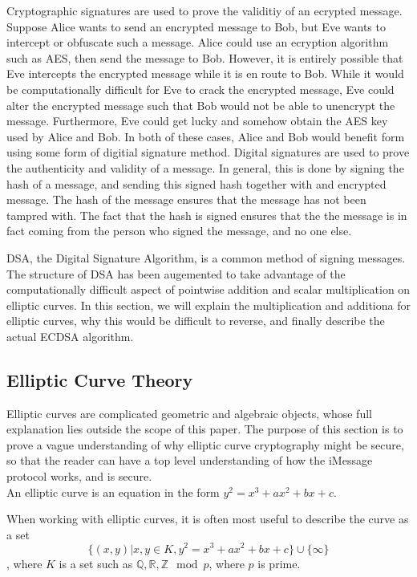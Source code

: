 Cryptographic signatures are used to prove the validitiy of an ecrypted message.
Suppose Alice wants to send an encrypted message to Bob, but Eve wants to intercept
or obfuscate such a message.  Alice could use an ecryption algorithm such as AES,
then send the message to Bob.  However, it is entirely possible that Eve intercepts
the encrypted message while it is en route to Bob.  While it would be computationally
difficult for Eve to crack the encrypted message, Eve could alter the encrypted message
such that Bob would not be able to unencrypt the message. Furthermore, Eve could get lucky
and somehow obtain the AES key used by Alice and Bob. In both of these cases, Alice and Bob
would benefit form using some form of digitial signature method.  Digital signatures
are used to prove the authenticity and validity of a message.  In general, this is done by
signing the hash of a message, and sending this signed hash together with and encrypted message.
The hash of the message ensures that the message has not been
tampred with.  The fact that the hash is signed ensures that the the message is in fact coming
from the person who signed the message, and no one else.

DSA, the Digital Signature Algorithm, is a common method of signing messages.
The structure of DSA has been augemented to take advantage of the
computationally difficult aspect of pointwise addition and scalar multiplication
on elliptic curves.  In this section, we will explain the multiplication
and additiona for elliptic curves, why this would be difficult to reverse,
and finally describe the actual ECDSA algorithm.


\subsection{Elliptic Curve Theory}

Elliptic curves are complicated geometric and algebraic objects,
whose full explanation lies outside the scope of this paper.
The purpose of this section is to prove a vague understanding
of why elliptic curve cryptography might be secure, so that the reader
can have a top level understanding of how the iMessage protocol
works, and is secure.\\

An elliptic curve is an equation in the form $y^2 = x^3 + ax^2 + bx + c$.

When working with elliptic curves, it is often most useful to describe the curve as a set
$$\{(x,y) \vert x,y \in K, y^2 = x^3 + ax^2 + bx + c\} \cup \{ \infty \}$$, where $K$ is a set such as
$\mathbb{Q}, \mathbb{R}, \mathbb{Z} \mod p$, where $p$ is prime.

